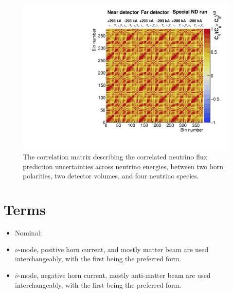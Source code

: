 \documentclass{article}
\begin{document}
\begin{figure}
  \includegraphics[width=\textwidth]{plots/mats/ErrorMatrices_corrmat}
  \caption{The correlation matrix describing the correlated neutrino flux prediction uncertainties across neutrino energies, between two horn polarities, two detector volumes, and four neutrino species.}
  \label{fig:corrmat}
\end{figure}

\section{Terms}

\begin{itemize}
\item Nominal:
\item $\nu$-mode, positive horn current, and mostly matter beam are used interchangeably, with the first being the preferred form.
\item $\bar{\nu}$-mode, negative horn current, mostly anti-matter beam are used interchangeably, with the first being the preferred form.
\end{itemize}
\end{document}
